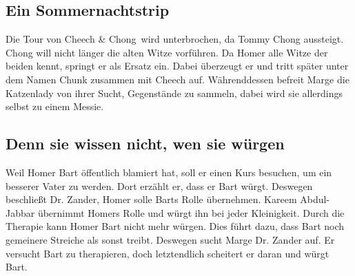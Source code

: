 

\subsection{Ein Sommernachtstrip}
Die Tour von \glqq Cheech \& Chong\grqq\ wird unterbrochen, da Tommy Chong aussteigt. Chong will nicht länger die alten Witze vorführen. Da Homer alle Witze der beiden kennt, springt er als Ersatz ein. Dabei überzeugt er und tritt später unter dem Namen Chunk zusammen mit Cheech auf. Währenddessen befreit Marge die Katzenlady von ihrer Sucht, Gegenstände zu sammeln, dabei wird sie allerdings selbst zu einem Messie.


\subsection{Denn sie wissen nicht, wen sie würgen}
Weil Homer Bart öffentlich blamiert hat, soll er einen Kurs besuchen, um ein besserer Vater zu werden. Dort erzählt er, dass er Bart würgt. Deswegen beschließt Dr. Zander, Homer solle Barts Rolle übernehmen. Kareem Abdul-Jabbar über\-nimmt Homers Rolle und würgt ihn bei jeder Kleinigkeit. Durch die Therapie kann Homer Bart nicht mehr würgen. Dies führt dazu, dass Bart noch gemeinere Streiche als sonst treibt. Deswegen sucht Marge Dr. Zander auf. Er versucht Bart zu therapieren, doch letztendlich scheitert er daran und würgt Bart. 



